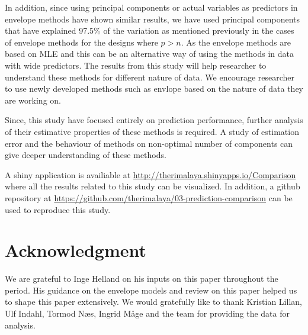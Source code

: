 \documentclass[12pt,3p,authoryear]{elsarticle}
\begin{document}
In addition, since using principal components or actual variables as
predictors in envelope methods have shown similar results, we have used
principal components that have explained 97.5\% of the variation as
mentioned previously in the cases of envelope methods for the designs
where \(p>n\). As the envelope methods are based on MLE and this can be
an alternative way of using the methods in data with wide predictors.
The results from this study will help researcher to understand these
methods for different nature of data. We encourage researcher to use
newly developed methods such as envlope based on the nature of data they
are working on.

Since, this study have focused entirely on prediction performance,
further analysis of their estimative properties of these methods is
required. A study of estimation error and the behaviour of methods on
non-optimal number of components can give deeper understanding of these
methods.

A shiny application \citep{shiny} is availiable at
\url{http://therimalaya.shinyapps.io/Comparison} where all the results
related to this study can be visualized. In addition, a github
repository at
\url{https://github.com/therimalaya/03-prediction-comparison} can be
used to reproduce this study.

\section{Acknowledgment}\label{acknowledgment}

We are grateful to Inge Helland on his inputs on this paper throughout
the period. His guidance on the envelope models and review on this paper
helped us to shape this paper extensively. We would gratefully like to
thank Kristian Lillan, Ulf Indahl, Tormod Næs, Ingrid Måge and the team
for providing the data for analysis.

\hypertarget{refs}{}

\appendix



\renewcommand\refname{References}

\end{document}
